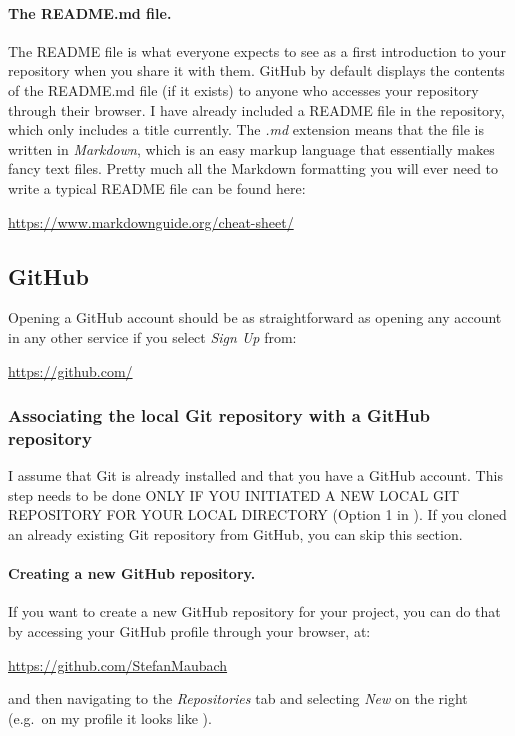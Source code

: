 \documentclass[a4paper,10pt]{article}
\begin{document}
\paragraph{The README.md file.} The README file is what everyone expects to see as a first introduction to your repository when you share it with them. GitHub by default displays the contents of the README.md file (if it exists) to anyone who accesses your repository through their browser. I have already included a README file in the repository, which only includes a title currently. The \emph{.md} extension means that the file is written in \emph{Markdown}, which is an easy markup language that essentially makes fancy text files. Pretty much all the Markdown formatting you will ever need to write a typical README file can be found here:

\url{https://www.markdownguide.org/cheat-sheet/}


\subsection{GitHub}

Opening a GitHub account should be as straightforward as opening any account in any other service if you select \emph{Sign Up} from: 

\url{https://github.com/}


\subsubsection{Associating the local Git repository with a GitHub repository}

I assume that Git is already installed and that you have a GitHub account. This step needs to be done ONLY IF YOU INITIATED A NEW LOCAL GIT REPOSITORY FOR YOUR LOCAL DIRECTORY (Option 1 in ). If you cloned an already existing Git repository from GitHub, you can skip this section.

\paragraph{Creating a new GitHub repository.} If you want to create a new GitHub repository for your project, you can do that by accessing your GitHub profile through your browser, at:

\url{https://github.com/StefanMaubach}

and then navigating to the \emph{Repositories} tab and selecting \emph{New} on the right (e.g.\ on my profile it looks like ).
\end{document}
